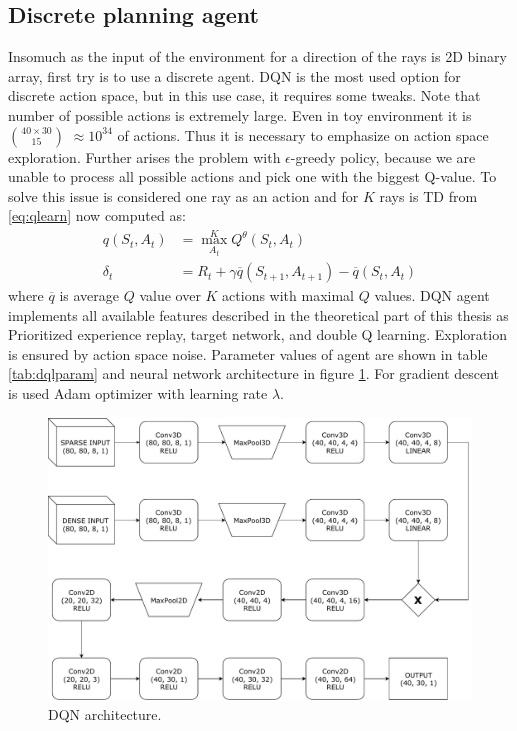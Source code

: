 \subsection{Discrete planning agent}
Insomuch as the input of the environment for a direction of the rays is 2D binary array, first try is to use a discrete agent. DQN is the most used option for discrete action space, but in this use case, it requires some tweaks. Note that number of possible actions is extremely large. Even in toy environment it is $40\times30 \choose 15$ $\approx 10^{34}$ of actions. Thus it is necessary to emphasize on action space exploration. Further arises the problem with $\epsilon$-greedy policy, because we are unable to process all possible actions and pick one with the biggest Q-value. To solve this issue is considered one ray as an action and for $K$ rays is TD from \eqref{eq:qlearn} now computed as:
\begin{align}
q(S_t, A_t) &= \max\limits_{A_t}^K Q^\theta(S_t, A_t)\\
\delta_t &= R_t + \gamma \overline{q}(S_{t+1}, A_{t+1}) - \overline{q}(S_t, A_t)
\end{align}
where $\overline{q}$ is average $Q$ value over $K$ actions with maximal $Q$ values. DQN agent implements all available features described in the theoretical part of this thesis as Prioritized experience replay, target network, and double Q learning. Exploration is ensured by action space noise. Parameter values of agent are shown in table \ref{tab:dqlparam} and neural network architecture in figure \ref{fig:dqn}. For gradient descent is used Adam optimizer with learning rate $\lambda$.

\clearpage
\begin{figure}[!h]
\centering
\includegraphics[scale=0.6]{fig/dql.pdf}
\caption{DQN architecture.}
\label{fig:dqn}
\end{figure}

